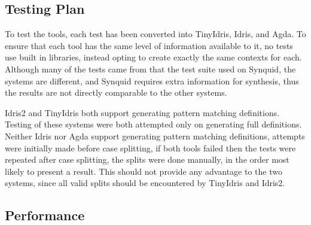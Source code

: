 \documentclass[a4paper]{article}
\begin{document}
\subsection{Testing Plan}

To test the tools, each test has been converted into TinyIdris,
Idris, and Agda. To ensure that each tool has the same level
of information available to it, no tests use built in libraries,
instead opting to create exactly the same contexts for each.
Although many of the tests came from that the test suite used on
Synquid, the systems are different, and Synquid requires extra
information for synthesis, thus the results are not directly
comparable to the other systems.


Idris2 and TinyIdris both support generating
pattern matching definitions. Testing of these systems
were both attempted only on generating full definitions.
Neither Idris nor Agda support generating pattern matching
definitions, attempts were initially made before case splitting,
if both tools failed then the tests were repeated after
case splitting, the splits were done manually,
in the order most likely to present a result. This should not
provide any advantage to the two systems, since all valid splits
should be encountered by TinyIdris and Idris2.

\clearpage

\subsection{Performance}
\label{sec:org9ac3710}
\end{document}
